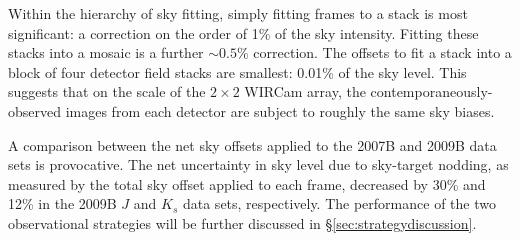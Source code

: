 \documentclass[iop]{emulateapj}
\begin{document}
Within the hierarchy of sky fitting, simply fitting frames to a stack is most significant: a correction on the order of 1\% of the sky intensity. Fitting these stacks into a mosaic is a further $\sim 0.5\%$ correction. The offsets to fit a stack into a block of four detector field stacks are smallest: 0.01\% of the sky level. This suggests that on the scale of the $2\times 2$ WIRCam array, the contemporaneously-observed images from each detector are subject to roughly the same sky biases.

A comparison between the net sky offsets applied to the 2007B and 2009B data sets is provocative. The net uncertainty in sky level due to sky-target nodding, as measured by the total sky offset applied to each frame, decreased by 30\% and 12\% in the 2009B $J$ and $K_s$ data sets, respectively. The performance of the two observational strategies will be further discussed in \S \ref{sec:strategydiscussion}.

% 
\end{document}
